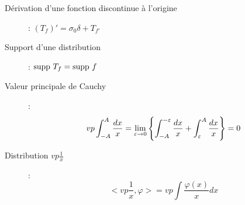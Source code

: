 \begin{description}
\begin{description}
\end{description}
\item[Dérivation d'une fonction discontinue à l'origine] : $(T_f)'=\sigma_0\delta+T_{f'}$
\item[Support d'une distribution] : $\textrm{supp } T_f=\textrm{supp } f$
\item[Valeur principale de Cauchy] : 
    \[
        vp\int_{-A}^A\frac{dx}{x}=\lim_{\varepsilon\rightarrow0}\left\{
            \int_{-A}^{-\varepsilon}\frac{dx}{x}
            +\int_\varepsilon^A\frac{dx}{x}
            \right\}=0
    \]
\item[Distribution $vp\frac{1}{x}$] : 
    \[
        <vp\frac{1}{x},\varphi>=vp\int\frac{\varphi(x)}{x}dx
    \]
\end{description}